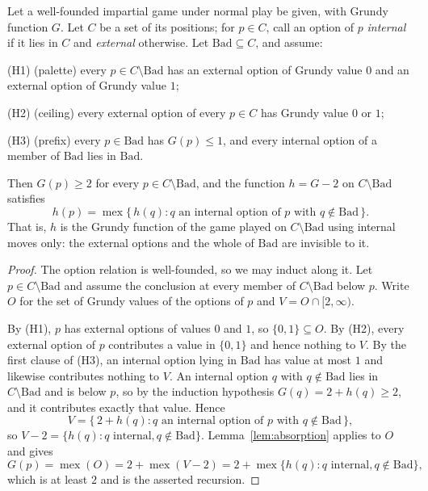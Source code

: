 \begin{theorem}\label{thm:transfer}
Let a well-founded impartial game under normal play be given, with Grundy
function $G$. Let $C$ be a set of its positions; for $p \in C$, call an
option of $p$ \emph{internal} if it lies in $C$ and \emph{external}
otherwise. Let $\mathrm{Bad} \subseteq C$, and assume:

(H1) (palette) every $p \in C \setminus \mathrm{Bad}$ has an external
option of Grundy value $0$ and an external option of Grundy value $1$;

(H2) (ceiling) every external option of every $p \in C$ has Grundy value
$0$ or $1$;

(H3) (prefix) every $p \in \mathrm{Bad}$ has $G(p) \le 1$, and every
internal option of a member of $\mathrm{Bad}$ lies in $\mathrm{Bad}$.

Then $G(p) \ge 2$ for every $p \in C \setminus \mathrm{Bad}$, and the
function $h = G - 2$ on $C \setminus \mathrm{Bad}$ satisfies
\[ h(p) = \operatorname{mex}\{\, h(q) : q \text{ an internal option of }
p \text{ with } q \notin \mathrm{Bad} \,\}. \]
That is, $h$ is the Grundy function of the game played on
$C \setminus \mathrm{Bad}$ using internal moves only: the external
options and the whole of $\mathrm{Bad}$ are invisible to it.
\end{theorem}
\begin{proof}
The option relation is well-founded, so we may induct along it. Let
$p \in C \setminus \mathrm{Bad}$ and assume the conclusion at every member
of $C \setminus \mathrm{Bad}$ below $p$. Write $O$ for the set of Grundy
values of the options of $p$ and $V = O \cap [2, \infty)$.

By (H1), $p$ has external options of values $0$ and $1$, so
$\{0, 1\} \subseteq O$. By (H2), every external option of $p$ contributes
a value in $\{0, 1\}$ and hence nothing to $V$. By the first clause of
(H3), an internal option lying in $\mathrm{Bad}$ has value at most $1$
and likewise contributes nothing to $V$. An internal option $q$ with
$q \notin \mathrm{Bad}$ lies in $C \setminus \mathrm{Bad}$ and is below
$p$, so by the induction hypothesis $G(q) = 2 + h(q) \ge 2$, and it
contributes exactly that value. Hence
\[ V = \{\, 2 + h(q) : q \text{ an internal option of } p \text{ with }
q \notin \mathrm{Bad} \,\}, \]
so $V - 2 = \{ h(q) : q \text{ internal}, q \notin \mathrm{Bad} \}$.
Lemma~\ref{lem:absorption} applies to $O$ and gives
\[ G(p) = \operatorname{mex}(O) = 2 + \operatorname{mex}(V - 2)
= 2 + \operatorname{mex}\{ h(q) : q \text{ internal},
q \notin \mathrm{Bad} \}, \]
which is at least $2$ and is the asserted recursion.
\end{proof}

